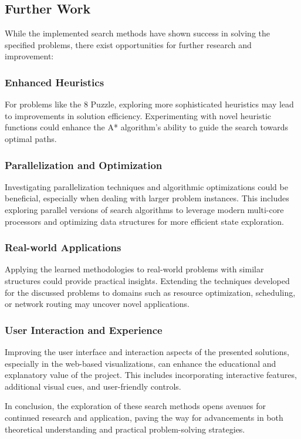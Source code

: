 \documentclass[12pt]{article}
\begin{document}
\subsection{Further Work}

While the implemented search methods have shown success in solving the specified problems, there exist opportunities for further research and improvement:

\subsubsection{Enhanced Heuristics}
For problems like the 8 Puzzle, exploring more sophisticated heuristics may lead to improvements in solution efficiency. Experimenting with novel heuristic functions could enhance the A* algorithm's ability to guide the search towards optimal paths.

\subsubsection{Parallelization and Optimization}
Investigating parallelization techniques and algorithmic optimizations could be beneficial, especially when dealing with larger problem instances. This includes exploring parallel versions of search algorithms to leverage modern multi-core processors and optimizing data structures for more efficient state exploration.

\subsubsection{Real-world Applications}
Applying the learned methodologies to real-world problems with similar structures could provide practical insights. Extending the techniques developed for the discussed problems to domains such as resource optimization, scheduling, or network routing may uncover novel applications.

\subsubsection{User Interaction and Experience}
Improving the user interface and interaction aspects of the presented solutions, especially in the web-based visualizations, can enhance the educational and explanatory value of the project. This includes incorporating interactive features, additional visual cues, and user-friendly controls.

In conclusion, the exploration of these search methods opens avenues for continued research and application, paving the way for advancements in both theoretical understanding and practical problem-solving strategies.

\clearpage
\thispagestyle{empty}


\end{document}
